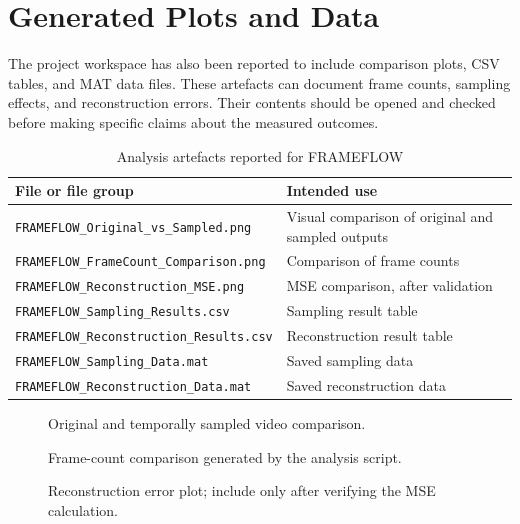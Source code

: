 \documentclass[12pt,a4paper,oneside]{report}
\begin{document}
\section{Generated Plots and Data}
The project workspace has also been reported to include comparison plots, CSV tables, and MAT data files. These artefacts can document frame counts, sampling effects, and reconstruction errors. Their contents should be opened and checked before making specific claims about the measured outcomes.
\begin{table}[H]
\centering
\caption{Analysis artefacts reported for FRAMEFLOW}
\begin{tabular}{p{}p{}}
\toprule
\textbf{File or file group} & \textbf{Intended use}\\
\midrule
\texttt{FRAMEFLOW\_Original\_vs\_Sampled.png} & Visual comparison of original and sampled outputs\\
\texttt{FRAMEFLOW\_FrameCount\_Comparison.png} & Comparison of frame counts\\
\texttt{FRAMEFLOW\_Reconstruction\_MSE.png} & MSE comparison, after validation\\
\texttt{FRAMEFLOW\_Sampling\_Results.csv} & Sampling result table\\
\texttt{FRAMEFLOW\_Reconstruction\_Results.csv} & Reconstruction result table\\
\texttt{FRAMEFLOW\_Sampling\_Data.mat} & Saved sampling data\\
\texttt{FRAMEFLOW\_Reconstruction\_Data.mat} & Saved reconstruction data\\
\bottomrule
\end{tabular}
\end{table}

\begin{figure}[H]\centering{}\caption{Original and temporally sampled video comparison.}\label{fig:originalsampled}\end{figure}
\begin{figure}[H]\centering{}\caption{Frame-count comparison generated by the analysis script.}\label{fig:framecounts}\end{figure}
\begin{figure}[H]\centering{}\caption{Reconstruction error plot; include only after verifying the MSE calculation.}\label{fig:mse}\end{figure}
\end{document}
